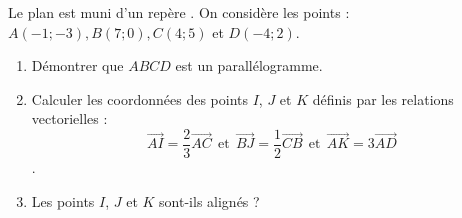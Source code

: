 
Le plan est muni d'un repère \Oij. 
On considère les points : $A(-1;-3), B(7;0), C(4;5)$ et $D(-4;2)$.
\begin{enumerate}
\item Démontrer que $ABCD$ est un parallélogramme.
\item  Calculer les coordonnées des points $I$, $J$ et $K$ définis par les relations vectorielles : $$\overrightarrow{AI}=\frac{2}{3}\overrightarrow{AC} ~~ \text{et}~~\overrightarrow{BJ}=\frac{1}{2}\overrightarrow{CB} ~~ \text{et}~~ \overrightarrow{AK}=3\overrightarrow{AD}$$.
\item  Les points $I$, $J$ et $K$ sont-ils alignés ?\end{enumerate}